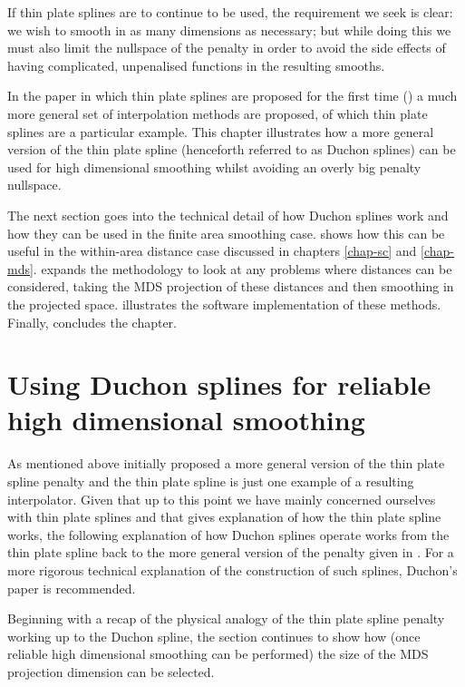 If thin plate splines are to continue to be used, the requirement we seek is clear: we wish to smooth in as many dimensions as necessary; but while doing this we must also limit the nullspace of the penalty in order to avoid the side effects of having complicated, unpenalised functions in the resulting smooths. 

In the paper in which thin plate splines are proposed for the first time (\cite{duchon77}) a much more general set of interpolation methods are proposed, of which thin plate splines are a particular example. This chapter illustrates how a more general version of the thin plate spline (henceforth referred to as Duchon splines) can be used for high dimensional smoothing whilst avoiding an overly big penalty nullspace.

The next section goes into the technical detail of how Duchon splines work and how they can be used in the finite area smoothing case.  shows how this can be useful in the within-area distance case discussed in chapters \ref{chap-sc} and \ref{chap-mds}.  expands the methodology to look at any problems where distances can be considered, taking the MDS projection of these distances and then smoothing in the projected space.  illustrates the software implementation of these methods. Finally,  concludes the chapter.

\section{Using Duchon splines for reliable high dimensional smoothing}

As mentioned above \cite{duchon77} initially proposed a more general version of the thin plate spline penalty and the thin plate spline is just one example of a resulting interpolator. Given that up to this point we have mainly concerned ourselves with thin plate splines and that  gives explanation of how the thin plate spline works, the following explanation of how Duchon splines operate works from the thin plate spline back to the more general version of the penalty given in \cite{duchon77}. For a more rigorous technical explanation of the construction of such splines, Duchon's paper is recommended.

Beginning with a recap of the physical analogy of the thin plate spline penalty working up to the Duchon spline, the section continues to show how (once reliable high dimensional smoothing can be performed) the size of the MDS projection dimension can be selected.


